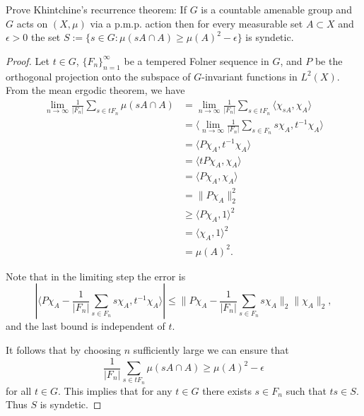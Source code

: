 \documentclass{article}
\begin{document}
 Prove Khintchine's recurrence theorem: If $G$ is a countable amenable group and $G$ acts on $(X,\mu)$ via a p.m.p. action then for every measurable
set $A \subset X$ and $\epsilon > 0$ the set
$S:= \{ s \in G: \mu(sA \cap A) \ge \mu(A)^2 - \epsilon\}$
is syndetic.
\begin{proof}
Let $t \in G$, $\{F_n\}_{n=1}^\infty$ be a tempered Folner sequence in $G$, and $P$ be the orthogonal projection onto the subspace of $G$-invariant functions in $L^2(X)$. From the mean ergodic theorem, we have
\begin{align*}
 \lim_{n \to \infty} \frac 1 {|F_n|} \sum_{s \in tF_n} \mu(sA \cap A) 
& = \lim_{n \to \infty} \frac 1 {|F_n|} \sum_{s \in tF_n} \langle  \chi_{sA}, \chi_{A} \rangle \\
& =  \langle \lim_{n \to \infty} \frac 1 {|F_n|} \sum_{s \in F_n}  s \chi_{A}, t^{-1} \chi_{A} \rangle \\
& = \langle P \chi_{A} , t^{-1} \chi_{A} \rangle \\
& = \langle t P \chi_{A} , \chi_{A} \rangle \\
& = \langle P \chi_{A} , \chi_{A} \rangle \\
& = \|P\chi_A\|_2^2 \\
& \ge \langle P\chi_A, 1 \rangle ^2 \\
& = \langle \chi_A, 1 \rangle ^2 \\
& = \mu(A)^2.
\end{align*}

Note that in the limiting step the error is 
$$
|\langle P \chi_{A} - \frac 1 {|F_n|} \sum_{s \in F_n}  s \chi_{A}, t^{-1} \chi_{A} \rangle| \le \|P \chi_{A} - \frac 1 {|F_n|} \sum_{s \in F_n}  s \chi_{A}\|_2 \|\chi_{A}\|_2,
$$
and the last bound is independent of $t$.

It follows that by choosing $n$ sufficiently large we can ensure that 
$$\frac 1 {|F_n|} \sum_{s \in tF_n} \mu(sA \cap A) \ge \mu(A)^2 - \epsilon$$
for all $t \in G$. This implies that for any $t \in G$ there exists $s \in F_n$ such that $ts \in S$. Thus $S$ is syndetic.
\end{proof}

\end{document}
